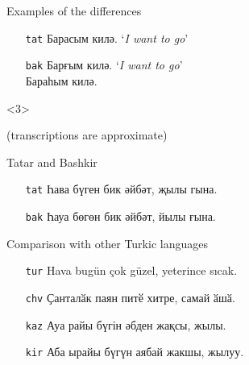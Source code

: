 \documentclass[10pt,xetex]{beamer} %
\begin{document}
\begin{frame}
\begin{onlyenv}
		\begin{block}{Examples of the differences}
			\begin{itemize}
				\item[{\small {\tt tat}}] Барасым килә. `\textit{I want to go}'
				\item[{\small {\tt bak}}] Барғым килә. `\textit{I want to go}'\\
				Бараһым килә.
			\end{itemize}	
		\end{block}

  \end{onlyenv}
  \begin{onlyenv}<3>
  
	(transcriptions are approximate)
	\begin{block}{Tatar and Bashkir}
		\begin{itemize}
			\item[{\small {\tt tat}}] Һава бүген бик әйбәт, җылы гына.  \\
			{}
			\item[{\small {\tt bak}}] Һауа бөгөн бик әйбәт, йылы ғына. \\
			{}
		\end{itemize}
	\end{block}

	\begin{block}{Comparison with other Turkic languages}
		\begin{itemize}
			\item[{\small {\tt tur}}] Hava bugün çok güzel, yeterince sıcak. \\
			{}
			\item[{\small {\tt chv}}] Ҫанталӑк паян питӗ хитре, самай ӑшӑ. \\
			{}
			\item[{\small {\tt kaz}}] Ауа райы бүгін әбден жақсы, жылы. \\
			{}
			\item[{\small {\tt kir}}] Аба ырайы бүгүн аябай жакшы, жылуу. \\
			{}
		\end{itemize}
	\end{block}
  
  \end{onlyenv}
  
\end{frame}
\end{document}
